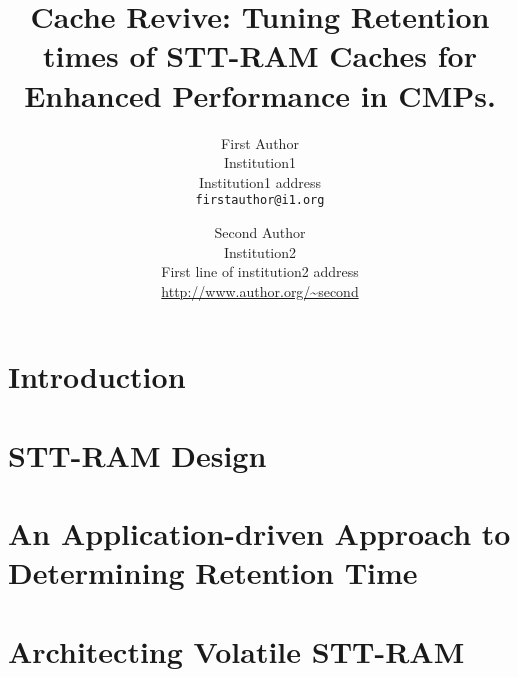 \documentclass[12pt,letterpaper]{article}
\begin{document}
\title{Cache Revive: Tuning Retention times of STT-RAM Caches for Enhanced
Performance in CMPs.}

\author{First Author\\
Institution1\\
Institution1 address\\
{\tt\small firstauthor@i1.org}
\and
Second Author\\
Institution2\\
First line of institution2 address\\
{\small\url{http://www.author.org/~second}}
}

\maketitle

\begin{abstract}

\end{abstract}
\section{Introduction} \label{sec:intro}

\section{STT-RAM Design} \label{sec:design}

\section{An Application-driven Approach to Determining Retention Time} \label{sec:motivation}

\section{Architecting Volatile STT-RAM} \label{sec:implementation}

\end{document}
